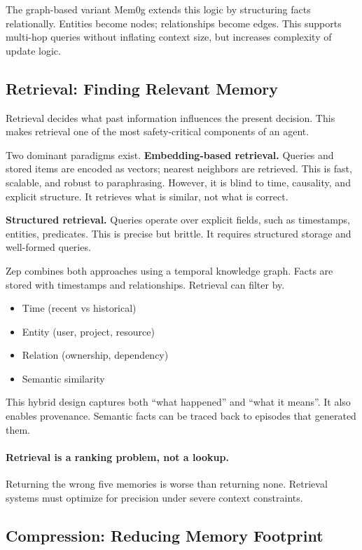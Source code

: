 The graph-based variant Mem0g extends this logic by structuring facts relationally. Entities become nodes; relationships become edges. This supports multi-hop queries without inflating context size, but increases complexity of update logic.

\subsection{Retrieval: Finding Relevant Memory}

Retrieval decides what past information influences the present decision. This makes retrieval one of the most safety-critical components of an agent.

Two dominant paradigms exist. \textbf{Embedding-based retrieval.}
Queries and stored items are encoded as vectors; nearest neighbors are retrieved. This is fast, scalable, and robust to paraphrasing. However, it is blind to time, causality, and explicit structure. It retrieves what is similar, not what is correct.

\textbf{Structured retrieval.}
Queries operate over explicit fields, such as timestamps, entities, predicates. This is precise but brittle. It requires structured storage and well-formed queries.

Zep \cite{rasmussen2025zep} combines both approaches using a temporal knowledge graph. Facts are stored with timestamps and relationships. Retrieval can filter by.
\begin{itemize}
\item Time (recent vs historical)
\item Entity (user, project, resource)
\item Relation (ownership, dependency)
\item Semantic similarity
\end{itemize}

This hybrid design captures both ``what happened'' and ``what it means''. It also enables provenance. Semantic facts can be traced back to episodes that generated them.

\paragraph{Retrieval is a ranking problem, not a lookup.}
Returning the wrong five memories is worse than returning none. Retrieval systems must optimize for precision under severe context constraints.

\subsection{Compression: Reducing Memory Footprint}

